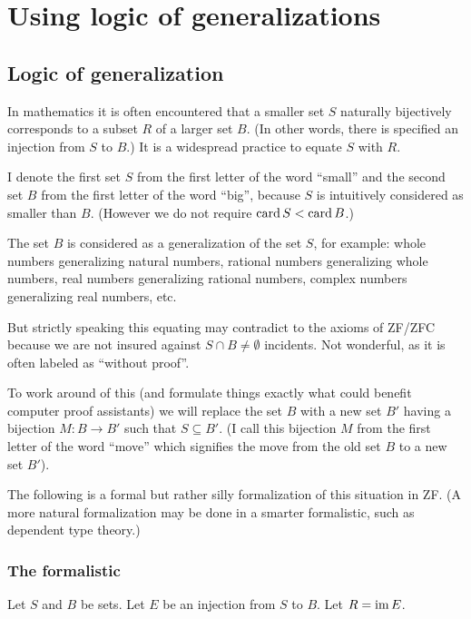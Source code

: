 \appendix

\chapter{\label{app:prim-exists}Using logic of generalizations}


\section{Logic of generalization}

In mathematics it is often encountered that a smaller set $S$ naturally
bijectively corresponds to a subset $R$ of a larger set $B$. (In
other words, there is specified an injection from $S$ to $B$.) It
is a widespread practice to equate $S$ with $R$.
\begin{rem}
I denote the first set $S$ from the first letter of the word ``small''
and the second set $B$ from the first letter of the word ``big'',
because $S$ is intuitively considered as smaller than $B$. (However
we do not require $\operatorname{card} S<\operatorname{card} B$.)
\end{rem}
The set $B$ is considered as a generalization of the set $S$, for
example: whole numbers generalizing natural numbers, rational numbers
generalizing whole numbers, real numbers generalizing rational numbers,
complex numbers generalizing real numbers, etc.

But strictly speaking this equating may contradict to the axioms of
ZF/ZFC because we are not insured against $S\cap B\neq\emptyset$
incidents. Not wonderful, as it is often labeled as ``without proof''.

To work around of this (and formulate things exactly what could benefit
computer proof assistants) we will replace the set $B$ with a new
set $B'$ having a bijection $M:B\rightarrow B'$ such that $S\subseteq B'$.
(I call this bijection $M$ from the first letter of the word ``move''
which signifies the move from the old set $B$ to a new set $B'$).

The following is a formal but rather silly formalization of this situation
in ZF. (A more natural formalization may be done in a smarter formalistic,
such as dependent type theory.)


\subsection{The formalistic}

Let $S$ and $B$ be sets. Let $E$ be an injection from $S$ to $B$.
Let $R=\operatorname{im} E$.


